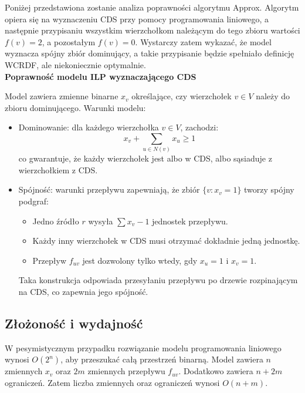 Poniżej przedstawiona zostanie analiza poprawności algorytmu Approx. Algorytm opiera się na wyznaczeniu CDS przy pomocy programowania liniowego, a następnie przypisaniu wszystkim wierzchołkom należącym do tego zbioru wartości \( f(v) = 2 \), a pozostałym \( f(v) = 0 \). Wystarczy zatem wykazać, że model wyznacza spójny zbiór dominujący, a takie przypisanie będzie spełniało definicję WCRDF, ale niekoniecznie optymalnie.\\
\textbf{Poprawność modelu ILP wyznaczającego CDS}

Model zawiera zmienne binarne \( x_v \) określające, czy wierzchołek \( v \in V \) należy do zbioru dominującego. Warunki modelu:

\begin{itemize}
    \item Dominowanie: dla każdego wierzchołka \( v \in V \), zachodzi:
    \[
    x_v + \sum_{u \in N(v)} x_u \geq 1
    \]
    co gwarantuje, że każdy wierzchołek jest albo w CDS, albo sąsiaduje z wierzchołkiem z CDS.

    \item Spójność: warunki przepływu zapewniają, że zbiór \( \{v : x_v = 1\} \) tworzy spójny podgraf:
    \begin{itemize}
        \item Jedno źródło  \( r \) wysyła \( \sum x_v - 1 \) jednostek przepływu.
        \item Każdy inny wierzchołek w CDS musi otrzymać dokładnie jedną jednostkę.
        \item Przepływ \( f_{uv} \) jest dozwolony tylko wtedy, gdy \( x_u = 1 \) i \( x_v = 1 \).
    \end{itemize}
    Taka konstrukcja odpowiada przesyłaniu przepływu po drzewie rozpinającym na CDS, co zapewnia jego spójność.
\end{itemize}

\subsection{Złożoność i wydajność}

W pesymistycznym przypadku rozwiązanie modelu programowania liniowego wynosi $O(2^n)$, aby przeszukać całą przestrzeń binarną. Model zawiera $n$ zmiennych $x_v$ oraz $2m$ zmiennych przepływu $f_{uv}$. Dodatkowo zawiera $n + 2m$ ograniczeń. Zatem liczba zmiennych oraz ograniczeń wynosi $O(n+m)$.

